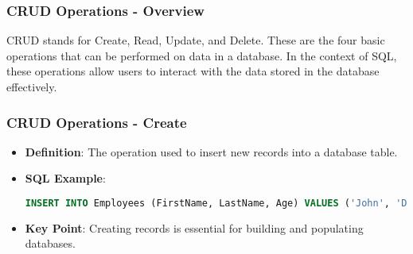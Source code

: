 \documentclass[aspectratio=169]{beamer}
\begin{document}
\begin{frame}[fragile]
  \frametitle{CRUD Operations - Overview}
  CRUD stands for Create, Read, Update, and Delete. These are the four basic operations that can be performed on data in a database. In the context of SQL, these operations allow users to interact with the data stored in the database effectively.
\end{frame}

\begin{frame}[fragile]
  \frametitle{CRUD Operations - Create}
  \begin{itemize}
    \item \textbf{Definition}: The operation used to insert new records into a database table.
    \item \textbf{SQL Example}:
    \begin{lstlisting}[language=SQL]
INSERT INTO Employees (FirstName, LastName, Age) VALUES ('John', 'Doe', 30);
    \end{lstlisting}
    \item \textbf{Key Point}: Creating records is essential for building and populating databases.
  \end{itemize}
\end{frame}
\end{document}

